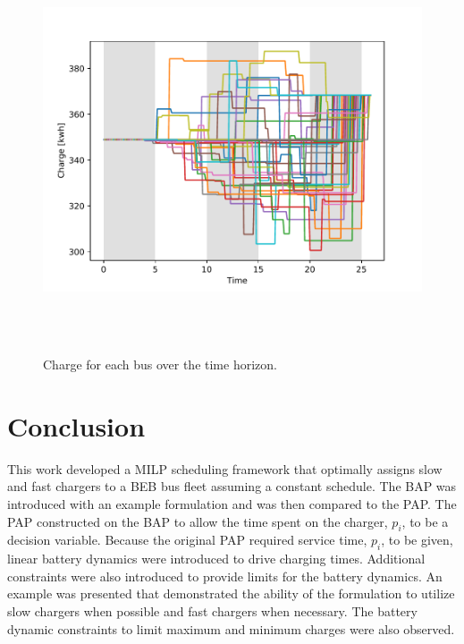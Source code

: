 \documentclass[letterpaper, 10pt, conference]{IEEEtran}
\begin{document}
\begin{figure}[h]
	\centering
	\includegraphics[trim=0in 0in 0in 0in, width=\linewidth, height=12cm]{charges.pdf}
	\caption{Charge for each bus over the time horizon.}
	\label{fig:charges}
\end{figure}

\section{Conclusion}
\label{sec:conclusion}
This work developed a MILP scheduling framework that optimally assigns slow and fast chargers to a BEB bus fleet
assuming a constant schedule. The BAP was introduced with an example formulation and was then compared to the PAP. The
PAP constructed on the BAP to allow the time spent on the charger, $p_i$, to be a decision variable. Because the
original PAP required service time, $p_i$, to be given, linear battery dynamics were introduced to drive charging times.
Additional constraints were also introduced to provide limits for the battery dynamics. An example was presented that
demonstrated the ability of the formulation to utilize slow chargers when possible and fast chargers when necessary. The
battery dynamic constraints to limit maximum and minimum charges were also observed.

\newpage



\end{document}
